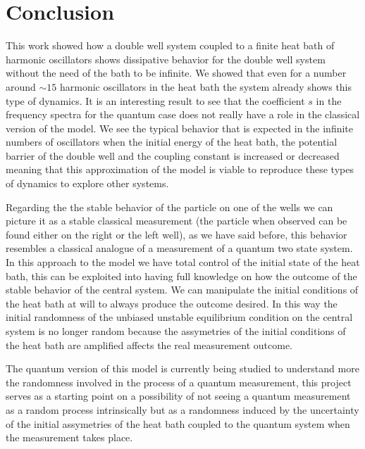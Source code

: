 \chapter{Conclusion}
This work showed how a double well system coupled to a finite heat bath of harmonic oscillators shows dissipative behavior for the double well system without the need of the bath to be infinite. We showed that even for a number around $\sim 15$ harmonic oscillators in the heat bath the system already shows this type of dynamics. It is an interesting result to see that the coefficient $s$ in the frequency spectra for the quantum case does not really have a role in the classical version of the model. We see the typical behavior that is expected in the infinite numbers of oscillators when the initial energy of the heat bath, the potential barrier of the double well and the coupling constant is increased or decreased meaning that this approximation of the model is viable to reproduce these types of dynamics to explore other systems.\par 

Regarding the the stable behavior of the particle on one of the wells we can picture it as a stable classical measurement (the particle when observed can be found either on the right or the left well), as we have said before, this behavior resembles a classical analogue of a measurement of a quantum two state system. In this approach to the model we have total control of the initial state of the heat bath, this can be exploited into having full knowledge on how the outcome of the stable behavior of the central system. We can manipulate the initial conditions of the heat bath at will to always produce the outcome desired. In this way the initial randomness of the unbiased unstable equilibrium condition on the central system is no longer random because the assymetries of the initial conditions of the heat bath are amplified affects the real measurement outcome.\par 

The quantum version of this model is currently being studied to understand more the randomness involved in the process of a quantum measurement, this project serves as a starting point on a possibility of not seeing a quantum measurement as a random process intrinsically but as a randomness induced by the uncertainty of the initial assymetries of the heat bath coupled to the quantum system when the measurement takes place.